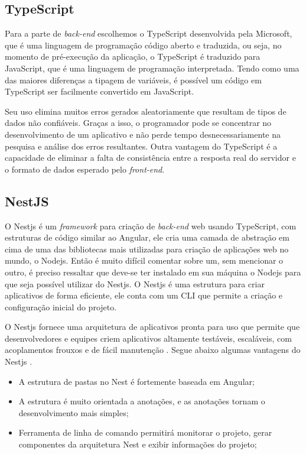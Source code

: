 \subsection{TypeScript}
Para a parte de \textit{back-end} escolhemos o TypeScript desenvolvida pela Microsoft, que é uma linguagem de programação código aberto e traduzida, ou seja, no momento de pré-execução da aplicação, o TypeScript é traduzido para JavaScript, que é uma linguagem de programação interpretada. Tendo como uma das maiores diferenças a tipagem de variáveis, é possível um código em TypeScript ser facilmente convertido em JavaScript. 

Seu uso elimina muitos erros gerados aleatoriamente que resultam de tipos de dados não confiáveis. Graças a isso, o programador pode se concentrar no desenvolvimento de um aplicativo e não perde tempo desnecessariamente na pesquisa e análise dos erros resultantes. Outra vantagem do TypeScript é a capacidade de eliminar a falta de consistência entre a resposta real do servidor e o formato de dados esperado pelo \textit{front-end}.\cite{Jakub2019TypeScript}

\subsection{NestJS}
O Nestjs é um \textit{framework} para criação de \textit{back-end} web usando TypeScript, com estruturas de código similar ao Angular, ele cria uma camada de abstração em cima de uma das bibliotecas mais utilizadas para criação de aplicações web no mundo, o Nodejs.  Então é muito difícil comentar sobre um, sem mencionar o outro, é preciso ressaltar que deve-se ter instalado em sua máquina o Nodejs para que seja possível utilizar do Nestjs. O Nestjs é uma estrutura para criar aplicativos de forma eficiente, ele conta com um CLI que permite a criação e configuração inicial do projeto.

O Nestjs fornece uma arquitetura de aplicativos pronta para uso que permite que desenvolvedores e equipes criem aplicativos altamente testáveis, escaláveis, com acoplamentos frouxos e de fácil manutenção \cite{kamil2020nestjs}. Segue abaixo algumas vantagens do Nestjs .

\begin{itemize}
    \item A estrutura de pastas no Nest é fortemente baseada em Angular; 
    \item A estrutura é muito orientada a anotações, e as anotações tornam o desenvolvimento mais simples;   
    \item Ferramenta de linha de comando permitirá monitorar o projeto, gerar componentes da arquitetura Nest e exibir informações do projeto;   
\end{itemize}

